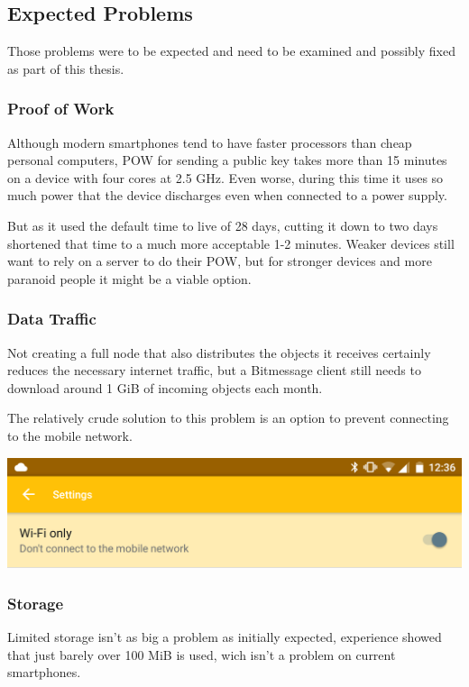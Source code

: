 \documentclass{bfh}
\begin{document}
  \subsection{Expected Problems}
  Those problems were to be expected and need to be examined and possibly fixed as part of this thesis.

  \subsubsection{Proof of Work}
  Although modern smartphones tend to have faster processors than cheap personal computers, \ac{POW} for sending a public key takes more than 15 minutes on a device with four cores at 2.5 GHz. Even worse, during this time it uses so much power that the device discharges even when connected to a power supply.

  But as it used the default time to live of 28 days, cutting it down to two days shortened that time to a much more acceptable 1-2 minutes. Weaker devices still want to rely on a server to do their \ac{POW}, but for stronger devices and more paranoid people it might be a viable option.

  \subsubsection{Data Traffic}
  Not creating a full node that also distributes the objects it receives certainly reduces the necessary internet traffic, but a Bitmessage client still needs to download around 1 GiB of incoming objects each month.

  The relatively crude solution to this problem is an option to prevent connecting to the mobile network.

  \begin{center}
    \includegraphics[width=0.8 \textwidth]{images/screenshot_wifi_only_setting.png}
  \end{center}

  \subsubsection{Storage}
  Limited storage isn't as big a problem as initially expected, experience showed that just barely over 100 MiB is used, wich isn't a problem on current smartphones.
\end{document}
